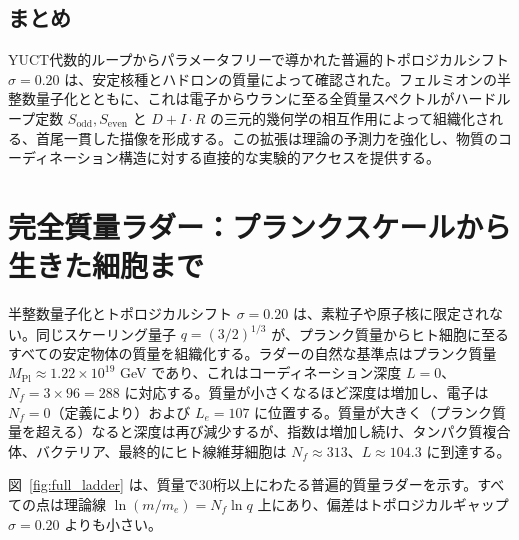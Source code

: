 \documentclass[12pt,a4paper]{article}
\begin{document}
	\subsection{まとめ}
	
	YUCT代数的ループからパラメータフリーで導かれた普遍的トポロジカルシフト \(\sigma = 0.20\) は、安定核種とハドロンの質量によって確認された。フェルミオンの半整数量子化とともに、これは電子からウランに至る全質量スペクトルがハードループ定数 \(S_{\mathrm{odd}}, S_{\mathrm{even}}\) と \(D+I\cdot R\) の三元的幾何学の相互作用によって組織化される、首尾一貫した描像を形成する。この拡張は理論の予測力を強化し、物質のコーディネーション構造に対する直接的な実験的アクセスを提供する。
	
	\section{完全質量ラダー：プランクスケールから生きた細胞まで}
	\label{sec:complete_ladder}
	
	半整数量子化とトポロジカルシフト \(\sigma = 0.20\) は、素粒子や原子核に限定されない。同じスケーリング量子 \(q = (3/2)^{1/3}\) が、プランク質量からヒト細胞に至るすべての安定物体の質量を組織化する。ラダーの自然な基準点はプランク質量 \(M_{\mathrm{Pl}} \approx 1.22 \times 10^{19}\) GeV であり、これはコーディネーション深度 \(L = 0\)、\(N_f = 3 \times 96 = 288\) に対応する。質量が小さくなるほど深度は増加し、電子は \(N_f = 0\)（定義により）および \(L_e = 107\) に位置する。質量が大きく（プランク質量を超える）なると深度は再び減少するが、指数は増加し続け、タンパク質複合体、バクテリア、最終的にヒト線維芽細胞は \(N_f \approx 313\)、\(L \approx 104.3\) に到達する。
	
	図~\ref{fig:full_ladder} は、質量で30桁以上にわたる普遍的質量ラダーを示す。すべての点は理論線 \(\ln(m/m_e) = N_f \ln q\) 上にあり、偏差はトポロジカルギャップ \(\sigma = 0.20\) よりも小さい。
	
\end{document}
